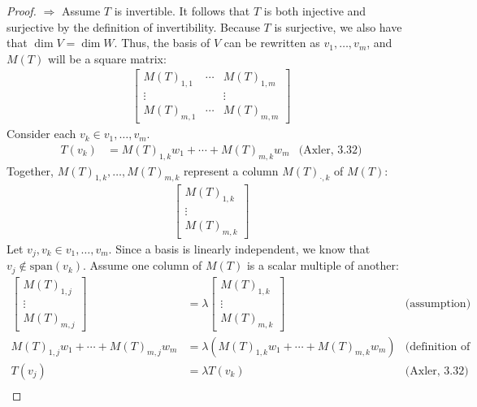 \documentclass[12pt,reqno]{article}
\theoremstyle{definition}
\begin{document}
\begin{proof}
    $\Rightarrow$ Assume $T$ is invertible. It follows that $T$ is both injective and surjective by the definition of invertibility. Because $T$ is surjective, we also have that $\dim V = \dim W$. Thus, the basis of $V$ can be rewritten as $v_1,\ldots,v_m$, and $M(T)$ will be a square matrix:
    \begin{align*}
        \begin{bmatrix}
            M(T)_{1,1} & \cdots & M(T)_{1, m}\\
            \vdots & & \vdots\\
            M(T)_{m, 1} & \cdots & M(T)_{m, m}
        \end{bmatrix}
    \end{align*}
    Consider each $v_k \in v_1,\ldots,v_m$.
    \begin{align*}
        T(v_k) &= M(T)_{1, k}w_1 + \cdots + M(T)_{m, k}w_m &\text{(Axler, 3.32)}
    \end{align*}
    Together, $M(T)_{1, k},\ldots,M(T)_{m, k}$ represent a column $M(T)_{\cdot,k}$ of $M(T)$:
    \begin{align*}
        \begin{bmatrix}
            M(T)_{1,k}\\
            \vdots\\
            M(T)_{m,k}
        \end{bmatrix}
    \end{align*}
    Let $v_j, v_k \in v_1,\ldots,v_m$. Since a basis is linearly independent, we know that $v_j \notin \mathrm{span}(v_k)$. Assume one column of $M(T)$ is a scalar multiple of another:
    \begin{align*}
        \begin{bmatrix}
            M(T)_{1,j}\\
            \vdots\\
            M(T)_{m,j}
        \end{bmatrix}
        &= \lambda
        \begin{bmatrix}
            M(T)_{1,k}\\
            \vdots\\
            M(T)_{m,k}
        \end{bmatrix}
        & \text{(assumption)}\\
        M(T)_{1,j}w_1 +\cdots+M(T)_{m,j}w_m &= \lambda(M(T)_{1,k}w_1+\cdots+M(T)_{m,k}w_m) & \text{(definition of matrix)}\\
        T(v_j) &= \lambda T(v_k) & \text{(Axler, 3.32)}\\

\end{align*}
\end{proof}
\end{document}
